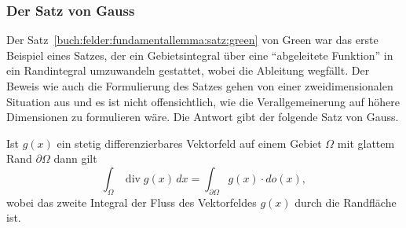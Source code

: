 %
%
\subsubsection{Der Satz von Gauss}

Der Satz~\ref{buch:felder:fundamentallemma:satz:green} von Green
war das erste Beispiel eines Satzes, der ein Gebietsintegral über eine
``abgeleitete Funktion'' in ein Randintegral umzuwandeln gestattet, wobei
die Ableitung wegfällt.
Der Beweis wie auch die Formulierung des Satzes gehen von einer
zweidimensionalen Situation aus und es ist nicht offensichtlich,
wie die Verallgemeinerung auf höhere Dimensionen zu formulieren wäre.
Die Antwort gibt der folgende Satz von Gauss.

\begin{satz}[Gauss]
\label{buch:felder:fundamentallemma:satz:gauss}
Ist $g(x)$ ein stetig differenzierbares Vektorfeld auf einem Gebiet
$\Omega$ mit glattem Rand $\partial\Omega$ dann gilt
\begin{equation}
\int_\Omega \operatorname{div}g(x)\,dx
=
\int_{\partial\Omega} g(x)\cdot do(x),
\label{buch:felder:fundamentallemma:eqn:gauss}
\end{equation}
wobei das zweite Integral der Fluss des Vektorfeldes $g(x)$ durch
die Randfläche ist.
\end{satz}

